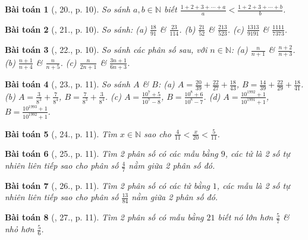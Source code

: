 \documentclass{article}
\newtheorem{baitoan}{Bài toán}
\begin{document}
\begin{baitoan}[\cite{Binh_Toan_6_tap_2}, 20., p. 10]
	So sánh $a,b\in\mathbb{N}$ biết $\frac{1 + 2 + 3 + \cdots + a}{a} < \frac{1 + 2 + 3 + \cdots + b}{b}$.
\end{baitoan}

\begin{baitoan}[\cite{Binh_Toan_6_tap_2}, 21., p. 10]
	So sánh: (a) $\frac{18}{91}$ \& $\frac{23}{114}$. (b) $\frac{21}{52}$ \& $\frac{213}{523}$. (c) $\frac{1313}{9191}$ \& $\frac{1111}{7373}$.
\end{baitoan}

\begin{baitoan}[\cite{Binh_Toan_6_tap_2}, 22., p. 10]
	So sánh các phân số sau, với $n\in\mathbb{N}$: (a) $\frac{n}{n + 1}$ \& $\frac{n + 2}{n + 3}$. (b) $\frac{n + 1}{n + 4}$ \& $\frac{n}{n + 5}$. (c) $\frac{n}{2n + 1}$ \& $\frac{3n + 1}{6n + 3}$.
\end{baitoan}

\begin{baitoan}[\cite{Binh_Toan_6_tap_2}, 23., p. 11]
	So sánh $A$ \& $B$: (a) $A = \frac{20}{39} + \frac{22}{27} + \frac{18}{43}$, $B = \frac{14}{39} + \frac{22}{29} + \frac{18}{41}$. (b) $A = \frac{3}{8^3} + \frac{7}{8^4}$, $B = \frac{7}{8^3} + \frac{3}{8^4}$. (c) $A = \frac{10^7 + 5}{10^7 - 8}$, $B = \frac{10^8 + 6}{10^8 - 7}$. (d) $A = \frac{10^{1992} + 1}{10^{1991} + 1}$, $B = \frac{10^{1993} + 1}{10^{1992} + 1}$.
\end{baitoan}

\begin{baitoan}[\cite{Binh_Toan_6_tap_2}, 24., p. 11]
	Tìm $x\in\mathbb{N}$ sao cho $\frac{4}{11} < \frac{x}{20} < \frac{5}{11}$.
\end{baitoan}

\begin{baitoan}[\cite{Binh_Toan_6_tap_2}, 25., p. 11]
	Tìm 2 phân số có các mẫu bằng $9$, các tử là 2 số tự nhiên liên tiếp sao cho phân số $\frac{4}{7}$ nằm giữa 2 phân số đó.
\end{baitoan}

\begin{baitoan}[\cite{Binh_Toan_6_tap_2}, 26., p. 11]
	Tìm 2 phân số có các tử bằng $1$, các mẫu là 2 số tự nhiên liên tiếp sao cho phân số $\frac{13}{84}$ nằm giữa 2 phân số đó.
\end{baitoan}

\begin{baitoan}[\cite{Binh_Toan_6_tap_2}, 27., p. 11]
	Tìm 2 phân số có mẫu bằng $21$ biết nó lớn hơn $\frac{5}{7}$ \& nhỏ hơn $\frac{5}{6}$.
\end{baitoan}
\end{document}
